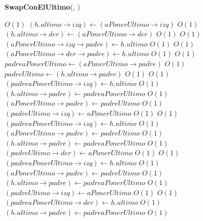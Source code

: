 \begin{Algoritmos}
 \begin{algorithm}[H]{\textbf{SwapConElUltimo}(, )}
    	\begin{algorithmic}[1]
	 \Comment $O(1)$					\State $(h.ultimo \rightarrow izq) \gets (aPonerUltimo \rightarrow izq)$ \Comment $O(1)$
			\State $(h.ultimo \rightarrow der) \gets (aPonerUltimo \rightarrow der)$ \Comment $O(1)$	
			 \Comment $O(1)$
				\State $(aPonerUltimo \rightarrow izq \rightarrow padre) \gets h.ultimo$ \Comment $O(1)$
			\EndIf	
			 \Comment $O(1)$
				\State $(aPonerUltimo \rightarrow der \rightarrow padre) \gets h.ultimo$ \Comment $O(1)$
			\EndIf		
			 \Comment $O(1)$
				\State $padreaPonerUltimo \gets (aPonerUltimo \rightarrow padre)$ \Comment $O(1)$
				\State $padreUltimo \gets (h.ultimo \rightarrow padre)$			 	 \Comment $O(1)$
			 	 \Comment $O(1)$
			 	\State $(padreaPonerUltimo \rightarrow izq) \gets h.ultimo$ \Comment $O(1)$
			 	\State $(h.ultimo \rightarrow padre) \gets padreaPonerUltimo$ \Comment $O(1)$
			 	\State $(aPonerUltimo \rightarrow padre) \gets padreUltimo$ \Comment $O(1)$
			 	\State $(padreUltimo \rightarrow izq) \gets aPonerUltimo$ \Comment $O(1)$
			 	\Else
			 		 \Comment $O(1)$
			 		\State $(padreaPonerUltimo \rightarrow izq) \gets h.ultimo$ \Comment $O(1)$
			 		\State $(aPonerUltimo \rightarrow padre) \gets padreUltimo$ \Comment $O(1)$
			 		\State $(h.ultimo \rightarrow padre) \gets padreaPonerUltimo$ \Comment $O(1)$
			 		\State $(padreUltimo \rightarrow der) \gets aPonerUltimo$ \Comment $O(1)$
			 		\Else
			 			 \Comment $O(1)$
			 			\State $(padreaPonerUltimo \rightarrow izq) \gets h.ultimo$ \Comment $O(1)$
			 			\State $(aPonerUltimo \rightarrow padre) \gets padreUltimo$ \Comment $O(1)$
			 			\State $(h.ultimo \rightarrow padre) \gets padreaPonerUltimo$ \Comment $O(1)$
			 			\State $(padreUltimo \rightarrow izq) \gets aPonerUltimo$ \Comment $O(1)$
			 			\Else
			 				 \Comment $O(1)$
			 				\State $(padreaPonerUltimo \rightarrow der) \gets h.ultimo$ \Comment $O(1)$
			 				\State $(h.ultimo \rightarrow padre) \gets padreaPonerUltimo$ \Comment $O(1)$

\end{algorithmic}
\end{algorithm}
\end{Algoritmos}
